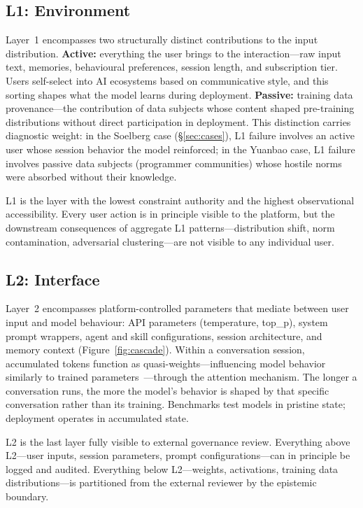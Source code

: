 \documentclass[11pt]{article}
\begin{document}
\subsection{L1: Environment}

Layer~1 encompasses two structurally distinct contributions to the input distribution. \textbf{Active:} everything the user brings to the interaction---raw input text, memories, behavioural preferences, session length, and subscription tier. Users self-select into AI ecosystems based on communicative style, and this sorting shapes what the model learns during deployment. \textbf{Passive:} training data provenance---the contribution of data subjects whose content shaped pre-training distributions without direct participation in deployment. This distinction carries diagnostic weight: in the Soelberg case (\S\ref{sec:cases}), L1 failure involves an active user whose session behavior the model reinforced; in the Yuanbao case, L1 failure involves passive data subjects (programmer communities) whose hostile norms were absorbed without their knowledge.

L1 is the layer with the lowest constraint authority and the highest observational accessibility. Every user action is in principle visible to the platform, but the downstream consequences of aggregate L1 patterns---distribution shift, norm contamination, adversarial clustering---are not visible to any individual user.

\subsection{L2: Interface}

Layer~2 encompasses platform-controlled parameters that mediate between user input and model behaviour: API parameters (temperature, top\_p), system prompt wrappers, agent and skill configurations, session architecture, and memory context (Figure~\ref{fig:cascade}). Within a conversation session, accumulated tokens function as quasi-weights---influencing model behavior similarly to trained parameters~\cite{dai2023can, olsson2022context}---through the attention mechanism. The longer a conversation runs, the more the model's behavior is shaped by that specific conversation rather than its training. Benchmarks test models in pristine state; deployment operates in accumulated state.

L2 is the last layer fully visible to external governance review. Everything above L2---user inputs, session parameters, prompt configurations---can in principle be logged and audited. Everything below L2---weights, activations, training data distributions---is partitioned from the external reviewer by the epistemic boundary.
\end{document}
